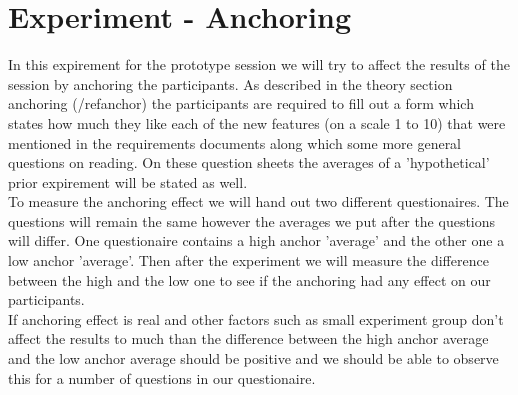 \section{Experiment - Anchoring}

In this expirement for the prototype session we will try to affect the results of the session by anchoring the participants. As described in the theory section anchoring (/ref{anchor}) the participants are required to fill out a form which states how much they like each of the new features (on a scale 1 to 10) that were mentioned in the requirements documents along which some more general questions on reading. On these question sheets the averages of a 'hypothetical' prior expirement will be stated as well. \\

To measure the anchoring effect we will hand out two different questionaires. The questions will remain the same however the averages we put after the questions will differ. One questionaire contains a high anchor 'average' and the other one a low anchor 'average'. Then after the experiment we will measure the difference between the high and the low one to see if the anchoring had any effect on our participants.\\

If anchoring effect is real and other factors such as small experiment group don't affect the results to much than the difference between the high anchor average and the low anchor average should be positive and we should be able to observe this for a number of questions in our questionaire.
